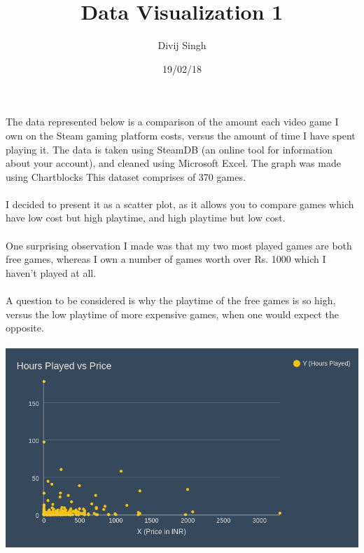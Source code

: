 \documentclass{article}
\title{Data Visualization 1}
\author{Divij Singh}
\date{19/02/18}
\begin{document}
	\maketitle
	
	The data represented below is a comparison of the amount each video game I own on the Steam gaming platform costs, versus the amount of time I have spent playing it. The data is taken using SteamDB (an online tool for information about your account), and cleaned using Microsoft Excel. The graph was made using Chartblocks This dataset comprises of 370 games.\\
	\\
	I decided to present it as a scatter plot, as it allows you to compare games which have low cost but high playtime, and high playtime but low cost.\\
	\\
	One surprising observation I made was that my two most played games are both free games, whereas I own a number of games worth over Rs. 1000 which I haven't played at all.\\
	\\
	A question to be considered is why the playtime of the free games is so high, versus the low playtime of more expensive games, when one would expect the opposite.\\
	\\
	
	\includegraphics[width=\textwidth]{scatter_plot}
	
	
\end{document}
